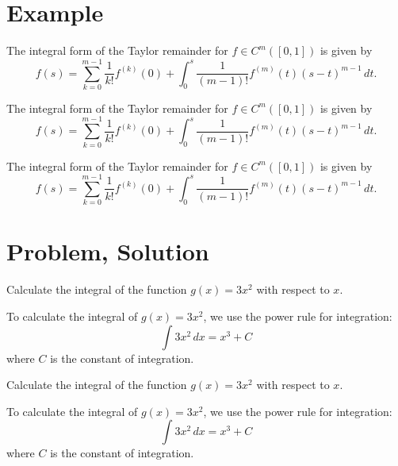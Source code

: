 \documentclass[fontset=none]{ctexart}
\begin{document}
\section{Example}

\begin{example}
    The integral form of the Taylor remainder for $f \in C^m([0,1])$ is given by
    \begin{equation*}
        f(s) = \sum_{k=0}^{m-1}\frac{1}{k!} f^{(k)}(0) + \int_0^s \frac{1}{(m-1)!} f^{(m)}(t)(s-t)^{m-1}\,dt.
    \end{equation*}
\end{example}

\begin{example}[xxx]
    The integral form of the Taylor remainder for $f \in C^m([0,1])$ is given by
    \begin{equation*}
        f(s) = \sum_{k=0}^{m-1}\frac{1}{k!} f^{(k)}(0) + \int_0^s \frac{1}{(m-1)!} f^{(m)}(t)(s-t)^{m-1}\,dt.
    \end{equation*}
\end{example}

\begin{example*}
    The integral form of the Taylor remainder for $f \in C^m([0,1])$ is given by
    \begin{equation*}
        f(s) = \sum_{k=0}^{m-1}\frac{1}{k!} f^{(k)}(0) + \int_0^s \frac{1}{(m-1)!} f^{(m)}(t)(s-t)^{m-1}\,dt.
    \end{equation*}
\end{example*}

\section{Problem, Solution}

\begin{problem}
Calculate the integral of the function $g(x) = 3x^2$ with respect to $x$.
\end{problem}

\begin{solution}
    To calculate the integral of $g(x) = 3x^2$, we use the power rule for integration:
    \[
        \int 3x^2 \, dx = x^3 + C
    \]
    where $C$ is the constant of integration.
\end{solution}

\begin{problem}[xxx]
Calculate the integral of the function $g(x) = 3x^2$ with respect to $x$.
\end{problem}
\begin{solution}[xxx]
    To calculate the integral of $g(x) = 3x^2$, we use the power rule for integration:
    \[
        \int 3x^2 \, dx = x^3 + C
    \]
    where $C$ is the constant of integration.
\end{solution}
\end{document}
